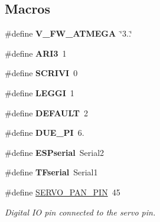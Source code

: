 \subsection*{Macros}
\begin{DoxyCompactItemize}
\item 
\mbox{\label{ari_pi__2_d_c__esp__08_8ino_ac4e2d6235f12dec9dc3674a0e0a139ba}} 
\#define {\bfseries V\+\_\+\+F\+W\+\_\+\+A\+T\+M\+E\+GA}~\char`\"{}3..\char`\"{}
\item 
\mbox{\label{ari_pi__2_d_c__esp__08_8ino_af5e2c0a692b6b075e9a95ac11a5c5b06}} 
\#define {\bfseries A\+R\+I3}~1
\item 
\mbox{\label{ari_pi__2_d_c__esp__08_8ino_a0795d970ec6b0998fc398ecba0dc1fbc}} 
\#define {\bfseries S\+C\+R\+I\+VI}~0
\item 
\mbox{\label{ari_pi__2_d_c__esp__08_8ino_a6f99aa69652bb4f0435fbf31d21ba7c9}} 
\#define {\bfseries L\+E\+G\+GI}~1
\item 
\mbox{\label{ari_pi__2_d_c__esp__08_8ino_a3da44afeba217135a680a7477b5e3ce3}} 
\#define {\bfseries D\+E\+F\+A\+U\+LT}~2
\item 
\mbox{\label{ari_pi__2_d_c__esp__08_8ino_a8e296a962daed7fa0ffeeab350593594}} 
\#define {\bfseries D\+U\+E\+\_\+\+PI}~6.
\item 
\mbox{\label{ari_pi__2_d_c__esp__08_8ino_a3059d914dc801da27fea64290d8f0a28}} 
\#define {\bfseries E\+S\+Pserial}~Serial2
\item 
\mbox{\label{ari_pi__2_d_c__esp__08_8ino_a09582c1cafb46dfb44288122f23ed702}} 
\#define {\bfseries T\+Fserial}~Serial1
\item 
\mbox{\label{ari_pi__2_d_c__esp__08_8ino_acc60ca04f3ee450b48548582048ed8fa}} 
\#define \mbox{\hyperlink{ari_pi__2_d_c__esp__08_8ino_acc60ca04f3ee450b48548582048ed8fa}{S\+E\+R\+V\+O\+\_\+\+P\+A\+N\+\_\+\+P\+IN}}~45
\begin{DoxyCompactList}\small\item\em Digital IO pin connected to the servo pin. \end{DoxyCompactList}\item 

\end{DoxyCompactItemize}
